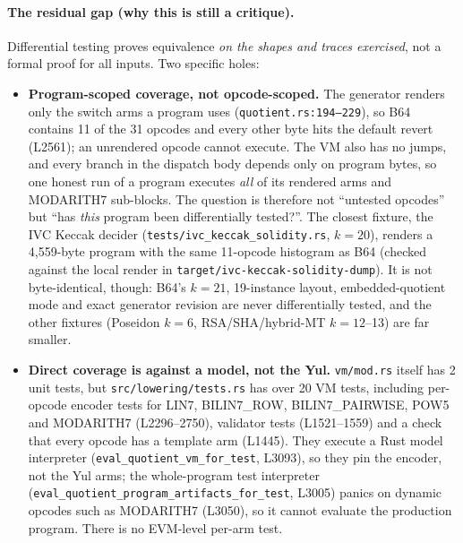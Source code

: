 \paragraph{The residual gap (why this is still a critique).}
Differential testing proves equivalence \emph{on the shapes and
traces exercised}, not a formal proof for all inputs. Two
specific holes:
\begin{itemize}[leftmargin=1.4em,itemsep=2pt]
\item \textbf{Program-scoped coverage, not opcode-scoped.} The
  generator renders only the switch arms a program uses
  (\texttt{quotient.rs:194--229}), so B64 contains 11 of the
  31 opcodes and every other byte hits the default revert (L2561);
  an unrendered opcode cannot execute. The VM also has no jumps, and
  every branch in the dispatch body depends only on program bytes,
  so one honest run of a program executes \emph{all} of its rendered
  arms and MODARITH7 sub-blocks. The question is therefore not
  ``untested opcodes'' but ``has \emph{this} program been
  differentially tested?''. The closest fixture, the IVC Keccak
  decider (\texttt{tests/\allowbreak{}ivc\_\allowbreak{}keccak\_\allowbreak{}solidity.rs}, $k{=}20$), renders
  a 4{,}559-byte program with the same 11-opcode histogram as B64
  (checked against the local render in
  \texttt{target/\allowbreak{}ivc-keccak-solidity-dump}). It is not byte-identical,
  though: B64's $k{=}21$, 19-instance layout, embedded-quotient mode and
  exact generator revision are never differentially tested, and the
  other fixtures (Poseidon $k{=}6$, RSA/SHA/hybrid-MT $k{=}12$--13) are
  far smaller.
\item \textbf{Direct coverage is against a model, not the Yul.}
  \texttt{vm/mod.rs} itself has 2 unit tests, but
  \texttt{src/\allowbreak{}lowering/\allowbreak{}tests.rs} has over 20 VM tests,
  including per-opcode encoder tests for LIN7, BILIN7\_ROW,
  BILIN7\_PAIRWISE, POW5 and MODARITH7 (L2296--2750), validator
  tests (L1521--1559) and a check that every opcode has a template
  arm (L1445). They execute a Rust model interpreter
  (\texttt{eval\_\allowbreak{}quotient\_\allowbreak{}vm\_\allowbreak{}for\_\allowbreak{}test}, L3093), so they pin the
  encoder, not the Yul arms; the whole-program test interpreter
  (\texttt{eval\_\allowbreak{}quotient\_\allowbreak{}program\_\allowbreak{}artifacts\_\allowbreak{}for\_\allowbreak{}test}, L3005)
  panics on dynamic opcodes such as MODARITH7 (L3050), so it cannot
  evaluate the production program. There is no EVM-level per-arm test.
\end{itemize}


